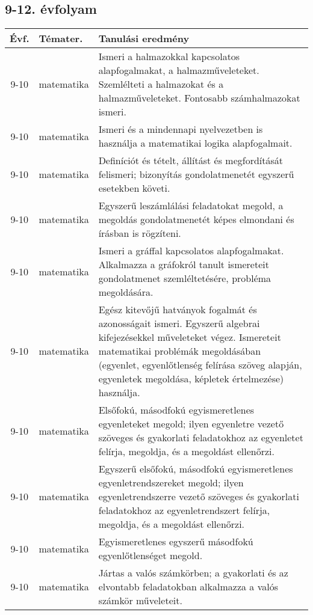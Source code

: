 \subsection{9-12. évfolyam}
\begin{small}
  \begin{longtable}{c | p{2cm} |  p{11cm} }
    \textbf{Évf.} & \textbf{Témater.} & \textbf{Tanulási eredmény} \\ \hline \hline
    \endhead

              9-10 & matematika & Ismeri a halmazokkal kapcsolatos alapfogalmakat, a halmazműveleteket. Szemlélteti a halmazokat és a halmazműveleteket. Fontosabb számhalmazokat ismeri. \\ \hline
              9-10 & matematika & Ismeri és a mindennapi nyelvezetben is használja a matematikai logika alapfogalmait. \\ \hline
              9-10 & matematika & Definíciót és tételt, állítást és megfordítását felismeri; bizonyítás gondolatmenetét egyszerű esetekben követi. \\ \hline
              9-10 & matematika & Egyszerű leszámlálási feladatokat megold, a megoldás gondolatmenetét képes elmondani és írásban is rögzíteni. \\ \hline
              9-10 & matematika & Ismeri a gráffal kapcsolatos alapfogalmakat. Alkalmazza a gráfokról tanult ismereteit gondolatmenet szemléltetésére, probléma megoldására. \\ \hline
              9-10 & matematika & Egész kitevőjű hatványok fogalmát és azonosságait ismeri. Egyszerű algebrai kifejezésekkel műveleteket végez. Ismereteit matematikai problémák megoldásában (egyenlet, egyenlőtlenség felírása szöveg alapján, egyenletek megoldása, képletek értelmezése) használja. \\ \hline
              9-10 & matematika & Elsőfokú, másodfokú egyismeretlenes egyenleteket megold; ilyen egyenletre vezető szöveges és gyakorlati feladatokhoz az egyenletet felírja, megoldja, és a megoldást ellenőrzi. \\ \hline
              9-10 & matematika & Egyszerű elsőfokú, másodfokú egyismeretlenes egyenletrendszereket megold; ilyen egyenletrendszerre vezető szöveges és gyakorlati feladatokhoz az egyenletrendszert felírja, megoldja, és a megoldást ellenőrzi. \\ \hline
              9-10 & matematika & Egyismeretlenes egyszerű másodfokú egyenlőtlenséget megold. \\ \hline
              9-10 & matematika & Jártas a valós számkörben; a gyakorlati és az elvontabb feladatokban alkalmazza a valós számkör műveleteit. \\ \hline

\end{longtable}
\end{small}
